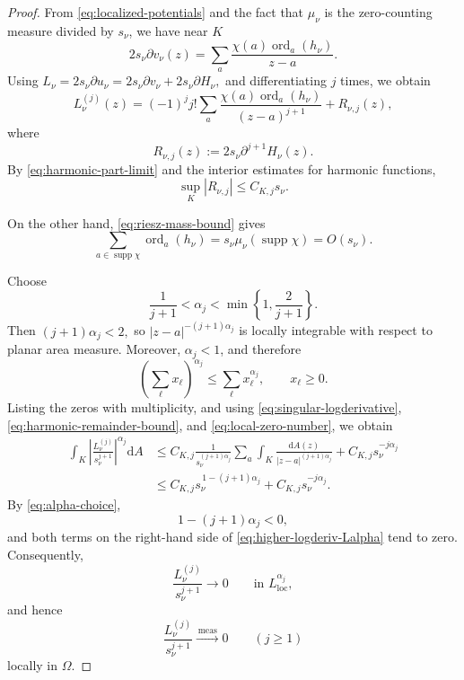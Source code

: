 \documentclass[12pt,letterpaper,reqno]{amsart}
\theoremstyle{definition}
\numberwithin{equation}{section}
\newcommand{\loc}{\mathrm{loc}}
\newcommand{\convmeas}{\xrightarrow{\,\mathrm{meas}\,}}
\DeclareMathOperator{\supp}{supp}
\DeclareMathOperator{\ord}{ord}
\begin{document}
\begin{proof}
From \eqref{eq:localized-potentials} and the fact that
\(\mu_\nu\) is the zero-counting measure divided by \(s_\nu\), we have
near \(K\)
\[
2s_\nu\partial v_\nu(z)
 =
 \sum_a
 \frac{\chi(a)\ord_a(h_\nu)}{z-a}.
\]
Using
$
L_\nu=2s_\nu\partial u_\nu
     =2s_\nu\partial v_\nu+2s_\nu\partial H_\nu,
$
and differentiating \(j\) times, we obtain
\begin{equation}\label{eq:singular-logderivative}
 L_\nu^{(j)}(z)
 =
 (-1)^j j!
 \sum_a
 \frac{\chi(a)\ord_a(h_\nu)}
 {(z-a)^{j+1}}
 +
 R_{\nu,j}(z),
\end{equation}
where
\[
R_{\nu,j}(z)
 :=
 2s_\nu\partial^{j+1}H_\nu(z).
\]
By \eqref{eq:harmonic-part-limit} and the interior estimates for
harmonic functions,
\begin{equation}\label{eq:harmonic-remainder-bound}
 \sup_K|R_{\nu,j}|
 \leq C_{K,j}s_\nu.
\end{equation}

On the other hand, \eqref{eq:riesz-mass-bound} gives
\begin{equation}\label{eq:local-zero-number}
 \sum_{a\in\supp\chi}\ord_a(h_\nu)
 =
 s_\nu\mu_\nu(\supp\chi)
 =
 O(s_\nu).
\end{equation}

Choose
\begin{equation}\label{eq:alpha-choice}
 \frac1{j+1}
 <
 \alpha_j
 <
 \min\left\{1,\frac2{j+1}\right\}.
\end{equation}
Then
$
(j+1)\alpha_j<2,
$
so
$
|z-a|^{-(j+1)\alpha_j}
$
is locally integrable with respect to planar area measure. Moreover,
\(\alpha_j<1\), and therefore
\[
\left(\sum_\ell x_\ell\right)^{\alpha_j}
\leq
\sum_\ell x_\ell^{\alpha_j},
\qquad x_\ell\geq0.
\]
Listing the zeros with multiplicity, and using
\eqref{eq:singular-logderivative},
\eqref{eq:harmonic-remainder-bound}, and
\eqref{eq:local-zero-number}, we obtain
\begin{equation}\label{eq:higher-logderiv-Lalpha}
\begin{aligned}
 \int_K
 \left|
 \frac{L_\nu^{(j)}}{s_\nu^{j+1}}
 \right|^{\alpha_j}\mathrm dA
 &\leq
 C_{K,j}
 \frac1{s_\nu^{(j+1)\alpha_j}}
 \sum_a
 \int_K
 \frac{\mathrm dA(z)}
 {|z-a|^{(j+1)\alpha_j}}
 +C_{K,j}s_\nu^{-j\alpha_j}
 \\
 &\leq
 C_{K,j}s_\nu^{\,1-(j+1)\alpha_j}
 +C_{K,j}s_\nu^{-j\alpha_j}.
\end{aligned}
\end{equation}
By \eqref{eq:alpha-choice},
\[
1-(j+1)\alpha_j<0,
\]
and both terms on the right-hand side of
\eqref{eq:higher-logderiv-Lalpha} tend to zero. Consequently,
\[
\frac{L_\nu^{(j)}}{s_\nu^{j+1}}
\longrightarrow0
\qquad\text{in }L^{\alpha_j}_{\loc},
\]
and hence
\begin{equation}\label{eq:higher-logderiv-measure}
 \frac{L_\nu^{(j)}}{s_\nu^{j+1}}
 \convmeas0
 \qquad(j\geq1)
\end{equation}
locally in \(\Omega\).


\end{proof}
\end{document}
